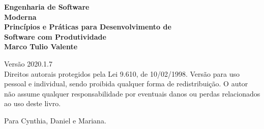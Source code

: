 \thispagestyle{empty}



\newpage
\thispagestyle{empty}
\vspace*{4cm}
\begin{center}
{\Huge \bf  Engenharia de Software\\[.3cm] Moderna}\\ 
\vspace*{1cm}
{\Large \bf  Princípios e Práticas para Desenvolvimento de\\[.3cm] Software com Produtividade}\\ 
\vspace*{3cm}
{\Large \bf Marco Tulio Valente}
\end{center}
\newpage

\newpage
\thispagestyle{empty}
\vspace*{3cm}
\begin{center}
{\Large  Versão 2020.1.7}\\ 
\vspace*{1cm}
{Direitos autorais protegidos pela Lei 9.610, de 10/02/1998. Versão para  uso pessoal e individual, sendo proibida qualquer forma de redistribuição. O autor não assume qualquer responsabilidade por eventuais danos ou perdas relacionados ao uso deste livro.}
\end{center}

\vspace*{3cm}




\newpage
\newpage

\thispagestyle{empty}
\vspace*{5cm}
\begin{center}
\large Para Cynthia, Daniel e Mariana.
\end{center}

\newpage
\newpage

\tableofcontents
